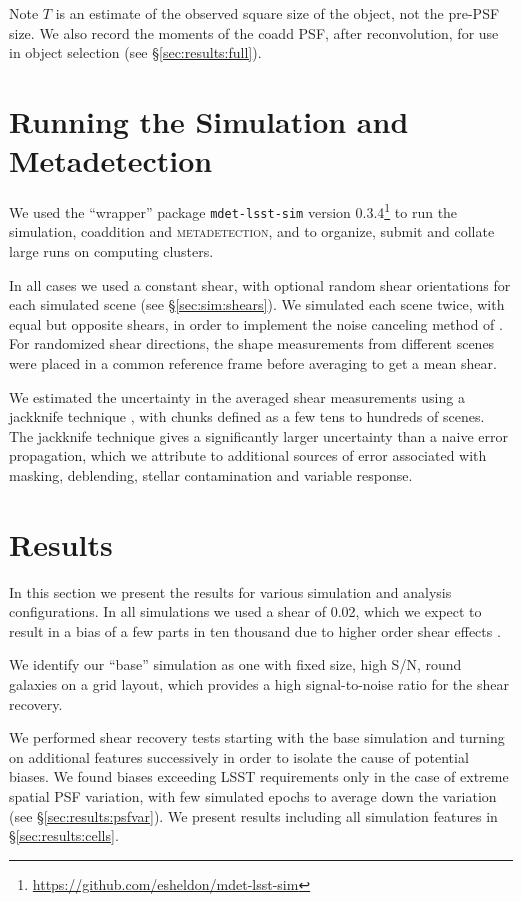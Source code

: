 \documentclass[twocolumn,twocolappendix,astrosym]{openjournal}
\newcommand{\mdet}{\textsc{metadetection}}
\newcommand{\mshear}{0.02}
\begin{document}
Note $T$ is an estimate of the observed square size of the object, not the
pre-PSF size.  We also record the moments of the coadd PSF, after
reconvolution, for use in object selection (see \S \ref{sec:results:full}).

\section{Running the Simulation and Metadetection} \label{sec:running}

We used the ``wrapper'' package \texttt{mdet-lsst-sim} version
0.3.4\footnote{\url{https://github.com/esheldon/mdet-lsst-sim}} to run the
simulation, coaddition and \mdet, and to organize, submit and collate large
runs on computing clusters.

In all cases we used a constant shear, with optional random shear orientations
for each simulated scene (see \S \ref{sec:sim:shears}).  We simulated each
scene twice, with equal but opposite shears, in order to implement the noise
canceling method of \cite{pujol2019}.  For randomized shear directions, the
shape measurements from different scenes were placed in a common reference
frame before averaging to get a mean shear.

We estimated the uncertainty in the averaged shear measurements using a
jackknife technique \citep{LuptonStats1993}, with chunks defined as a few tens
to hundreds of scenes.  The jackknife technique gives a significantly larger
uncertainty than a naive error propagation, which we attribute to additional
sources of error associated with masking, deblending, stellar contamination and
variable response.

\section{Results} \label{sec:results}

In this section we present the results for various simulation and analysis
configurations.  In all simulations we used a shear of \mshear, which we expect
to result in a bias of a few parts in ten thousand due to higher order
shear effects \citep{SheldonMcal2017,mdet20}.

We identify our ``base'' simulation as one with fixed size, high S/N, round
galaxies on a grid layout, which provides a high signal-to-noise ratio for the
shear recovery.

We performed shear recovery tests starting with the base simulation and turning
on additional features successively in order to isolate the cause of potential
biases.  We found biases exceeding LSST requirements only in the case of
extreme spatial PSF variation, with few simulated epochs to average down the
variation (see \S \ref{sec:results:psfvar}).  We present results including all
simulation features in \S \ref{sec:results:cells}.
\end{document}
